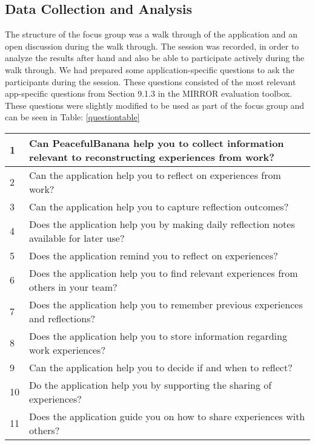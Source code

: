\subsection{Data Collection and Analysis}
The structure of the focus group was a walk through of the application and an open discussion during the walk through. The session was recorded, in order to analyze the results after hand and also be able to participate actively during the walk through. We had prepared some application-specific questions to ask the participants during the session. These questions consisted of the most relevant app-specific questions from Section 9.1.3 in the MIRROR evaluation toolbox\citep{mirrorevaluation}. These questions were slightly modified to be used as part of the focus group and can be seen in Table: \ref{questiontable}
\begin{table}[H]
    \begin{tabularx}{\textwidth}{|l|X|}
    \hline
    1  & Can PeacefulBanana help you to collect information relevant to reconstructing experiences from work? \\ \hline
    2  & Can the application help you to reflect on experiences from work?                                    \\ \hline
    3  & Can the application help you to capture reflection outcomes?                                         \\ \hline
    4  & Does the application help you by making daily reflection notes available for later use?              \\ \hline
    5  & Does the application remind you to reflect on experiences?                                           \\ \hline
    6  & Does the application help you to find relevant experiences from others in your team?                 \\ \hline
    7  & Does the application help you to remember previous experiences and reflections?                      \\ \hline
    8  & Does the application help you to store information regarding work experiences?                       \\ \hline
    9  & Can the application help you to decide if and when to reflect?                                       \\ \hline
    10 & Do the application help you by supporting the sharing of experiences?                                \\ \hline
    11 & Does the application guide you on how to share experiences with others?                              \\ \hline

\end{tabularx}
\end{table}
